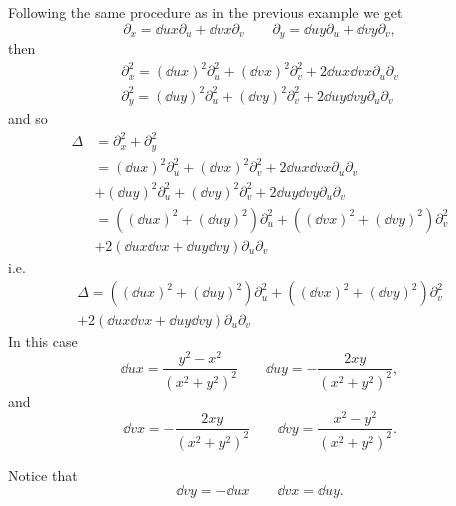 Following the same procedure as in the previous example we get
\begin{equation*}
	\partial_x=\dd{u}{x}\partial_u + \dd{v}{x}\partial_v \qquad
	\partial_y=\dd{u}{y}\partial_u + \dd{v}{y}\partial_v,
\end{equation*}
then
\begin{align*}
	\partial_x^2=
	  \left(\dd{u}{x}\right)^2\partial_u^2
	+ \left(\dd{v}{x}\right)^2\partial_v^2
	+ 2\dd{u}{x}\dd{v}{x}\partial_u\partial_v \\
	\partial_y^2=
	  \left(\dd{u}{y}\right)^2\partial_u^2
	+ \left(\dd{v}{y}\right)^2\partial_v^2
	+ 2\dd{u}{y}\dd{v}{y}\partial_u\partial_v
\end{align*}
and so
\begin{align*}
	\Delta &= \partial_x^2+\partial_y^2\\
	       &= \left(\dd{u}{x}\right)^2\partial_u^2
	+ \left(\dd{v}{x}\right)^2\partial_v^2
	+ 2\dd{u}{x}\dd{v}{x}\partial_u\partial_v\\
	       &+
	  \left(\dd{u}{y}\right)^2\partial_u^2
	+ \left(\dd{v}{y}\right)^2\partial_v^2
	+ 2\dd{u}{y}\dd{v}{y}\partial_u\partial_v\\
	       &=\left(\left(\dd{u}{x}\right)^2
	+\left(\dd{u}{y}\right)^2\right)\partial_u^2
	+\left(\left(\dd{v}{x}\right)^2
	+\left(\dd{v}{y}\right)^2\right)\partial_v^2\\
	       &+2\left(\dd{u}{x}\dd{v}{x}
	+\dd{u}{y}\dd{v}{y}\right)\partial_u\partial_v
\end{align*}
i.e.
\begin{multline}\label{laplacianuv}
	\Delta =\left(\left(\dd{u}{x}\right)^2
	+\left(\dd{u}{y}\right)^2\right)\partial_u^2
	       +\left(\left(\dd{v}{x}\right)^2
	+\left(\dd{v}{y}\right)^2\right)\partial_v^2\\
	       +2\left(\dd{u}{x}\dd{v}{x}
	+\dd{u}{y}\dd{v}{y}\right)\partial_u\partial_v
\end{multline}
In this case
\begin{equation}\label{partialu}
	\dd{u}{x}=\frac{y^2-x^2}{(x^2+y^2)^2} \qquad
	\dd{u}{y}=-\frac{2xy}{(x^2+y^2)^2},
\end{equation}
and
\begin{equation*}
	\dd{v}{x}=-\frac{2xy}{(x^2+y^2)^2} \qquad
	\dd{v}{y}=\frac{x^2-y^2}{(x^2+y^2)^2}.
\end{equation*}

Notice that
\begin{equation}\label{partialsRelations}
	\dd{v}{y}=-\dd{u}{x} \qquad
	\dd{v}{x}=\dd{u}{y}.
\end{equation}

